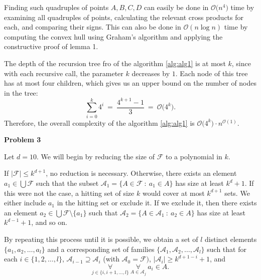\documentclass[12pt]{article}
\begin{document}
	Finding such quadruples of points \(A, B, C, D\) can easily be done in
	\(\mathcal{O} \big( n^{4} \big)\) time by examining all quadruples of
	points, calculating the relevant cross products for each, and comparing
	their signs. This can also be done in \(\mathcal{O} (n \log n)\) time by
	computing the convex hull using Graham's algorithm and applying the
	constructive proof of lemma 1.
	
	\medskip
	
	The depth of the recursion tree fro of the algorithm \ref{alg:alg1} is at
	most \(k\), since with each recursive call, the parameter \(k\) decreases
	by \(1\). Each node of this tree has at most four children, which gives us
	an upper bound on the number of nodes in the tree:
	\[ \sum\limits_{i = 0}^{k} 4^{i} \ = \ \frac{4^{k + 1} - 1}{3} \ = \
	\mathcal{O} \big( 4^{k} \big) \text{.} \]
	Therefore, the overall complexity of the algorithm \ref{alg:alg1} is
	\(\mathcal{O} \big( 4^{k} \big) \cdot n^{\mathcal{O}(1)}\).
	
	\bigskip
	
	\textbf{Problem 3}
	
	\medskip
	
	Let \(d = 10\). We will begin by reducing the size of \(\mathcal{F}\) to a
	polynomial in \(k\).
	
	\medskip
	
	If \(|\mathcal{F}| \leqslant k^{d + 1}\), no reduction is necessary.
	Otherwise, there exists an element \(a_{1} \in \bigcup \mathcal{F}\) such
	that the subset \(\mathcal{A}_{1} = \{A \in \mathcal{F} \ : \ a_{1} \in
	A\}\) has size at least \(k^{d} + 1\). If this were not the case, a hitting
	set of size \(k\) would cover at most \(k^{d + 1}\) sets. We either include
	\(a_{1}\) in the hitting set or exclude it. If we exclude it, then there
	exists an element \(a_{2} \in \bigcup \mathcal{F} \setminus \{a_{1}\}\) such
	that \(\mathcal{A}_{2} = \{A \in \mathcal{A}_{1} \ : \ a_{2} \in A\}\) has
	size at least \(k^{d - 1} + 1\), and so on.
	
	\medskip
	
	By repeating this process until it is possible, we obtain a set of \(l\)
	distinct elements \(\{a_{1}, a_{2}, \ldots, a_{l}\}\) and a corresponding
	set of families \(\{\mathcal{A}_{1}, \mathcal{A}_{2}, \ldots,
	\mathcal{A}_{l}\}\) such that for each \(i \in \{1, 2, \ldots, l\}\),
	\(\mathcal{A}_{i - 1} \supseteq \mathcal{A}_{i}\) (with \(\mathcal{A}_{0} =
	\mathcal{F})\), \(|\mathcal{A}_{i}| \geqslant k^{d + 1 - i} + 1\), and
	\[ \underset{j \in \{i, i + 1, \ldots, l\}}{\forall} \
	\underset{A \in \mathcal{A}_{j}}{\forall} \ a_{i} \in A \text{.} \]
	
\end{document}
